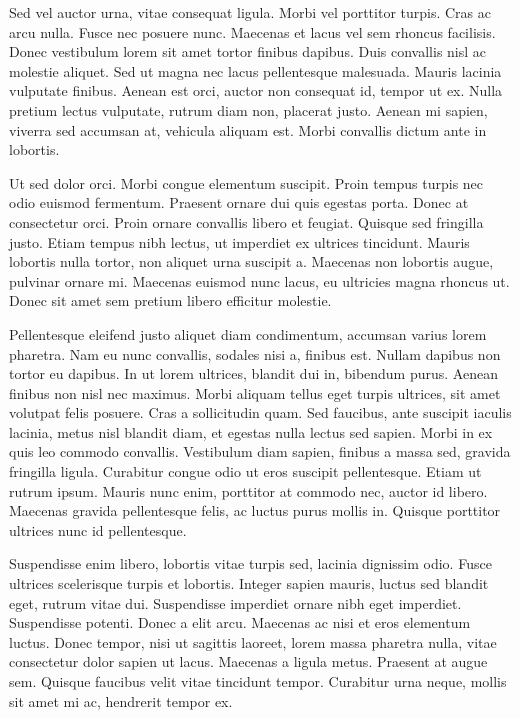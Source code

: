 Sed vel auctor urna, vitae consequat ligula. Morbi vel porttitor turpis. Cras ac arcu nulla. Fusce nec posuere nunc. Maecenas et lacus vel sem rhoncus facilisis. Donec vestibulum lorem sit amet tortor finibus dapibus. Duis convallis nisl ac molestie aliquet. Sed ut magna nec lacus pellentesque malesuada. Mauris lacinia vulputate finibus. Aenean est orci, auctor non consequat id, tempor ut ex. Nulla pretium lectus vulputate, rutrum diam non, placerat justo. Aenean mi sapien, viverra sed accumsan at, vehicula aliquam est. Morbi convallis dictum ante in lobortis.

Ut sed dolor orci. Morbi congue elementum suscipit. Proin tempus turpis nec odio euismod fermentum. Praesent ornare dui quis egestas porta. Donec at consectetur orci. Proin ornare convallis libero et feugiat. Quisque sed fringilla justo. Etiam tempus nibh lectus, ut imperdiet ex ultrices tincidunt. Mauris lobortis nulla tortor, non aliquet urna suscipit a. Maecenas non lobortis augue, pulvinar ornare mi. Maecenas euismod nunc lacus, eu ultricies magna rhoncus ut. Donec sit amet sem pretium libero efficitur molestie.

Pellentesque eleifend justo aliquet diam condimentum, accumsan varius lorem pharetra. Nam eu nunc convallis, sodales nisi a, finibus est. Nullam dapibus non tortor eu dapibus. In ut lorem ultrices, blandit dui in, bibendum purus. Aenean finibus non nisl nec maximus. Morbi aliquam tellus eget turpis ultrices, sit amet volutpat felis posuere. Cras a sollicitudin quam. Sed faucibus, ante suscipit iaculis lacinia, metus nisl blandit diam, et egestas nulla lectus sed sapien. Morbi in ex quis leo commodo convallis. Vestibulum diam sapien, finibus a massa sed, gravida fringilla ligula. Curabitur congue odio ut eros suscipit pellentesque. Etiam ut rutrum ipsum. Mauris nunc enim, porttitor at commodo nec, auctor id libero. Maecenas gravida pellentesque felis, ac luctus purus mollis in. Quisque porttitor ultrices nunc id pellentesque.

Suspendisse enim libero, lobortis vitae turpis sed, lacinia dignissim odio. Fusce ultrices scelerisque turpis et lobortis. Integer sapien mauris, luctus sed blandit eget, rutrum vitae dui. Suspendisse imperdiet ornare nibh eget imperdiet. Suspendisse potenti. Donec a elit arcu. Maecenas ac nisi et eros elementum luctus. Donec tempor, nisi ut sagittis laoreet, lorem massa pharetra nulla, vitae consectetur dolor sapien ut lacus. Maecenas a ligula metus. Praesent at augue sem. Quisque faucibus velit vitae tincidunt tempor. Curabitur urna neque, mollis sit amet mi ac, hendrerit tempor ex.

